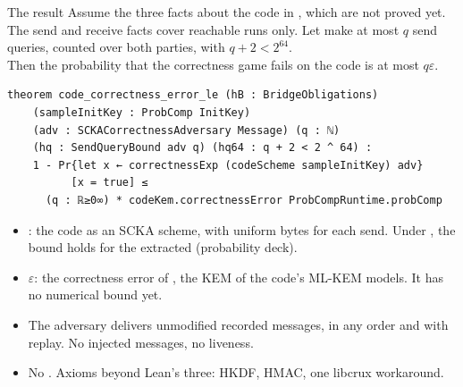 \begin{frame}[t,fragile]{The result}
  \vspace{0.2em}
  \footnotesize
  Assume the three facts about the code in , which are not proved yet. The
  send and receive facts cover reachable runs only. Let
   make at most $q$ send queries, counted over both parties, with $q + 2 < 2^{64}$.\\[0.3em]
  Then the probability that the correctness game fails on the code is at most $q\varepsilon$.
  \vspace{0.2em}
{\scriptsize
\begin{verbatim}
theorem code_correctness_error_le (hB : BridgeObligations)
    (sampleInitKey : ProbComp InitKey)
    (adv : SCKACorrectnessAdversary Message) (q : ℕ)
    (hq : SendQueryBound adv q) (hq64 : q + 2 < 2 ^ 64) :
    1 - Pr{let x ← correctnessExp (codeScheme sampleInitKey) adv}
          [x = true] ≤
      (q : ℝ≥0∞) * codeKem.correctnessError ProbCompRuntime.probComp
\end{verbatim}}
  \begin{itemize}\footnotesize
    \item {}: the code as an SCKA scheme, with uniform bytes for each send. Under
      , the bound holds for the extracted  (probability deck).
    \item $\varepsilon$: the correctness error of , the KEM of the code's ML-KEM
      models. It has no numerical bound yet.
    \item The adversary delivers unmodified recorded messages, in any order and with replay. No
      injected messages, no liveness.
    \item No . Axioms beyond Lean's three: HKDF, HMAC, one libcrux workaround.
  \end{itemize}
\end{frame}

